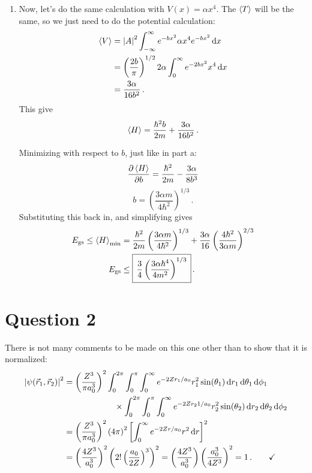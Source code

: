 \documentclass[11pt]{article}
\begin{document}
\begin{enumerate}[label=\alph*)]
\item Now, let's do the same calculation with $\displaystyle{V(x) = \alpha x^4}$. The $\ev{T}$ will be the same, so we just need to do the potential calculation:
\begin{align*}
\ev{V} & = \abs{A}^2 \int_{-\infty}^\infty e^{-bx^2}\alpha x^4 e^{-bx^2}\dd{x}\\
& = \left(\frac{2b}{\pi}\right)^{1/2} 2\alpha \int_0^\infty e^{-2bx^2}x^4\dd{x}\\
& = \frac{3\alpha}{16b^2} \, . 
\end{align*}
This give 
\[\ev{H} = \frac{\hbar^2 b}{2m} + \frac{3\alpha}{16b^2} \, . \]

Minimizing with respect to $b$, just like in part a:
\[\pdv{\ev{H}}{b} = \frac{\hbar^2}{2m} - \frac{3\alpha}{8b^3}\]
\[b = \left(\frac{3\alpha m}{4\hbar^2}\right)^{1/3} \, . \]
Substituting this back in, and simplifying gives
\begin{align*}
E_\text{gs} \leq \ev{H}_\text{min} & = \frac{\hbar^2}{2m}\left(\frac{3\alpha m}{4\hbar^2}\right)^{1/3} + \frac{3\alpha}{16}\left(\frac{4\hbar^2}{3\alpha m}\right)^{2/3}\\
E_\text{gs} & \leq \boxed{\, \frac{3}{4}\left(\frac{3\alpha \hbar^4}{4m^2}\right)^{1/3} \, }\, .	 
\end{align*}
\end{enumerate}

\newpage

\section*{Question 2}
There is not many comments to be made on this one other than to show that it is normalized:
\begin{align*}
\abs{\psi(\vec{r}_1, \vec{r}_2)}^2 & = \left(\frac{Z^3}{\pi a_0^3}\right)^2 \int_0^{2\pi}\int_0^\pi \int_0^\infty e^{-2Zr_1/a_0}r_1^2 \sin(\theta_1)\dd{r_1}\dd{\theta_1}\dd{\phi_1}\\
& \hspace{6em} \times \int_0^{2\pi}\int_0^\pi \int_0^\infty e^{-2Zr_21/a_0}r_2^2 \sin(\theta_2)\dd{r_2}\dd{\theta_2}\dd{\phi_2}\\
& = \left(\frac{Z^3}{\pi a_0^3}\right)^2 \left(4\pi\right)^2 \left[\int_0^\infty e^{-2Zr/a_0} r^2 \dd{r}\right]^2\\
& = \left(\frac{4Z^3}{a_0^3}\right)^2 \left(2! \left(\frac{a_0}{2Z}\right)^3\right)^2 = \left(\frac{4Z^3}{a_0^3}\right)\left(\frac{a_0^3}{4Z^3}\right)^2 = 1 \, . \qquad \checkmark
\end{align*}
\end{document}
